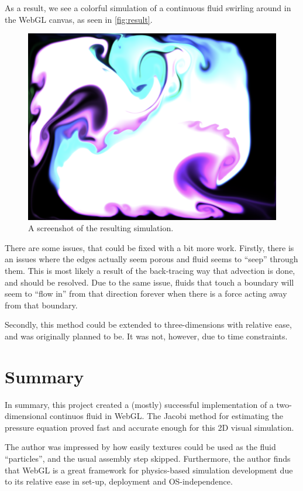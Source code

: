 As a result, we see a colorful simulation of a continuous fluid swirling around in
the WebGL canvas, as seen in \autoref{fig:result}.

\begin{figure}[H]
  \centering
  \includegraphics[width=\linewidth]{result.png}
  \caption{A screenshot of the resulting simulation.}
  \label{fig:result}
\end{figure}

There are some issues, that could be fixed with a bit more work.
Firstly, there is an issues where the edges actually seem porous and fluid seems to ``seep'' through them.
This is most likely a result of the back-tracing way that advection is done, and should be resolved.
Due to the same issue, fluids that touch a boundary will seem to ``flow in'' from that direction forever
when there is a force acting away from that boundary.

Secondly, this method could be extended to three-dimensions with relative ease, and was originally planned to be.
It was not, however, due to time constraints.

\section{Summary}

In summary, this project created a (mostly) successful implementation of a two-dimensional continuos fluid
in WebGL.
The Jacobi method for estimating the pressure equation proved fast and accurate enough for 
this 2D visual simulation.

The author was impressed by how easily textures could be used as the fluid ``particles'',
and the usual assembly step skipped. 
Furthermore, the author finds that WebGL is a great framework for physics-based simulation development
due to its relative ease in set-up, deployment and OS-independence.




